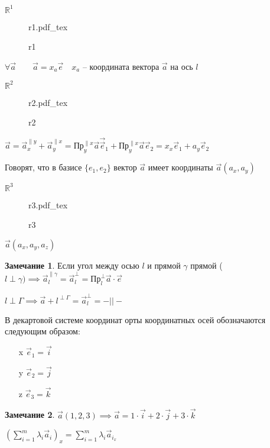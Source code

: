 \documentclass{book}
\newcommand\R{\ensuremath{\mathbb{R}}}
\theoremstyle{definition}
\newtheorem*{note}{Замечание}
\newcommand{\incfig}[1]{%
    \def\svgwidth{\columnwidth}
    {#1.pdf_tex}
}
\begin{document}
$\R^1$
\begin{figure}[ht]
    \centering
    \incfig{r1}
    \caption{r1}
    \label{fig:r1}
\end{figure}

$\forall \vec a\qquad \vec a = x_a \vec e\quad x_a$ -- координата вектора $\vec a$ на ось $l$

 $\R^2$

\begin{figure}[ht]
    \centering
    \incfig{r2}
    \caption{r2}
    \label{fig:r2}
\end{figure}

$\vec a = \vec a_x^{\parallel y} + \vec a_y^{\parallel x} = \text{Пр}_y^{\parallel x}\vec a\vec \vec e_1 + \text{Пр}_y^{\parallel x} \vec a\vec e_2 = x_x\vec e_1 + a_y\vec e_2$

\begin{definition}
    Говорят, что в базисе $\{e_1, e_2\}$ вектор $\vec a$ имеет координаты  $\vec a(a_x,a_y)$
\end{definition}

$\R^3$

\begin{figure}[ht]
    \centering
    \incfig{r3}
    \caption{r3}
    \label{fig:r3}
\end{figure}

$\vec a(a_x, a_y, a_z)$

 \begin{note}
     Если угол между осью $l$ и прямой  $\gamma$ прямой ( $l\perp \gamma ) \implies \vec a_l^{\parallel \gamma} = \vec a_l^{\perp} = \text{Пр}_l^{\perp} \vec a\cdot \vec e$ 

     $l \perp \Gamma \implies \vec a+l^{\perp \Gamma} = \vec a_l^{\perp} = -||-$
\end{note}
В декартовой системе координат орты координатных осей обозначаются следующим образом:
\begin{itemize}
    \item [x] $\vec  e_1 = \vec i$ 
    \item [y] $\vec e_2 = \vec j$
    \item [z] $\vec e_3 = \vec k$
\end{itemize}

\begin{note}
    $\vec a(1,2,3) \implies \vec a = 1\cdot \vec i + 2\cdot \vec j + 3\cdot \vec k$
\end{note}

\begin{lemma}
    $\left( \sum\limits_{i=1}^{m} \lambda_i \vec a_i \right) _x = \sum\limits_{i=1}^{m} \lambda _i\vec a_{i_x}$
\end{lemma}
\end{document}
